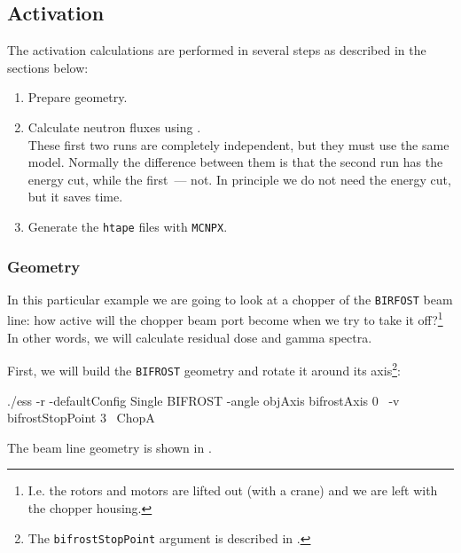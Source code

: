\subsection{Activation}

The activation calculations are performed in several steps as described in the sections below:
\begin{enumerate}
  \item Prepare geometry.
  \item Calculate neutron fluxes using . \\
    These first two runs are completely independent, but they must use the same model. 
    Normally the difference between them is that the second run has the energy cut, while the first~--- not.
    In principle we do not need the energy cut, but it saves time.
  \item Generate the {\tt htape} files with {\tt MCNPX}.
\end{enumerate}
\subsubsection{Geometry}
In this particular example we are going to look at a chopper
of the  {\tt BIRFOST} beam line: how active will the chopper beam
port become when we try to take it off?\footnote{I.e. the rotors and motors are lifted out (with a crane) and we are left with the chopper housing.} In other words, we will calculate residual dose and gamma spectra.

First, we will build the {\tt BIFROST} geometry and rotate it around
its axis\footnote{The {\tt bifrostStopPoint} argument is described in .}:

\begin{bash}
./ess -r -defaultConfig Single BIFROST -angle objAxis bifrostAxis 0 \
      -v bifrostStopPoint 3 \
      ChopA
\end{bash}

The beam line geometry is shown in .


